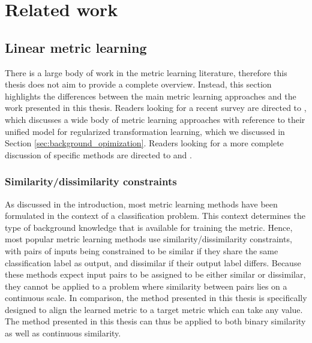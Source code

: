\section{Related work}

\quad


\subsection{Linear metric learning}

There is a large body of work in the metric learning literature, therefore this thesis does not aim to provide a complete overview. Instead, this section highlights the differences between the main metric learning approaches and the work presented in this thesis. Readers looking for a recent survey are directed to \cite{kulis2012metric}, which discusses a wide body of metric learning approaches with reference to their unified model for regularized transformation learning, which we discussed in Section \ref{sec:background_opimization}. Readers looking for a more complete discussion of specific methods are directed to \cite{bellet2013survey} and \cite{yang2006distance}.


\subsubsection{Similarity/dissimilarity constraints}

As discussed in the introduction, most metric learning methods have been formulated in the context of a classification problem. This context determines the type of background knowledge that is available for training the metric. Hence, most popular metric learning methods use similarity/dissimilarity constraints, with pairs of inputs being constrained to be similar if they share the same classification label as output, and dissimilar if their output label differs. \cite{davis2007information, kostinger2012large} Because these methods expect input pairs to be assigned to be either similar or dissimilar, they cannot be applied to a problem where similarity between pairs lies on a continuous scale. In comparison, the method presented in this thesis is specifically designed to align the learned metric to a target metric which can take any value. The method presented in this thesis can thus be applied to both binary similarity as well as continuous similarity.


